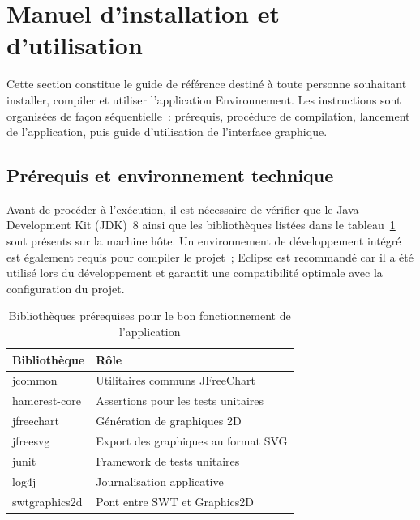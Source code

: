 \section{Manuel d'installation et d'utilisation}
\label{sec:manuel}

Cette section constitue le guide de référence destiné à toute personne souhaitant
installer, compiler et utiliser l'application Environnement. Les instructions
sont organisées de façon séquentielle~: prérequis, procédure de compilation,
lancement de l'application, puis guide d'utilisation de l'interface graphique.

\subsection{Prérequis et environnement technique}
\label{subsec:prerequis}

Avant de procéder à l'exécution, il est nécessaire de vérifier que le Java
Development Kit (JDK)~8 ainsi que les bibliothèques listées dans le
tableau~\ref{tab:prerequis} sont présents sur la machine hôte. Un environnement
de développement intégré est également requis pour compiler le projet~; Eclipse
est recommandé car il a été utilisé lors du développement et garantit une
compatibilité optimale avec la configuration du projet.

\begin{table}[htbp]
  \centering
  \begin{tabular}{ll}
    \toprule
    \textbf{Bibliothèque} & \textbf{Rôle} \\
    \midrule
    jcommon       & Utilitaires communs JFreeChart \\
    hamcrest-core & Assertions pour les tests unitaires \\
    jfreechart    & Génération de graphiques 2D \\
    jfreesvg      & Export des graphiques au format SVG \\
    junit         & Framework de tests unitaires \\
    log4j         & Journalisation applicative \\
    swtgraphics2d & Pont entre SWT et Graphics2D \\
    \bottomrule
  \end{tabular}
  \caption{Bibliothèques prérequises pour le bon fonctionnement de l'application}
  \label{tab:prerequis}
\end{table}

